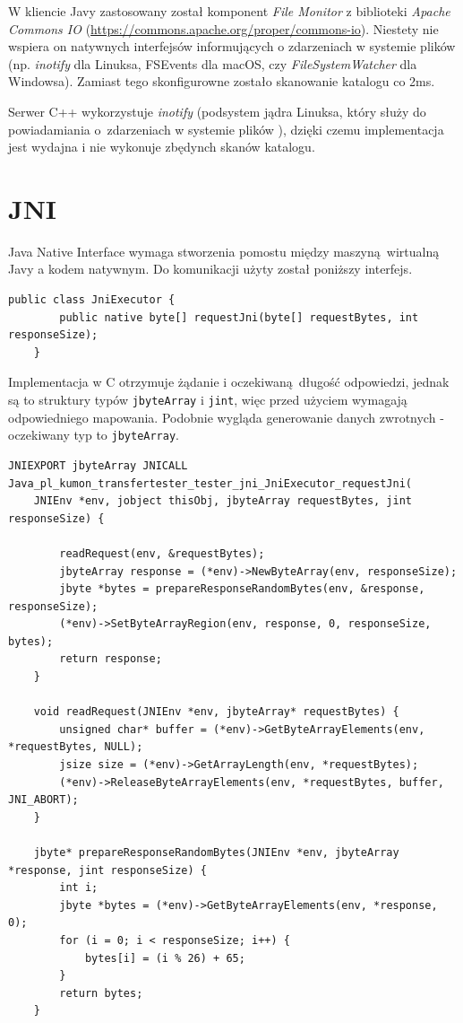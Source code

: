 W kliencie Javy zastosowany został komponent \textit{File Monitor} z biblioteki \textit{Apache Commons IO} (\url{https://commons.apache.org/proper/commons-io}). Niestety nie wspiera on natywnych interfejsów informujących o zdarzeniach w systemie plików (np. \textit{inotify} dla Linuksa, FSEvents dla macOS, czy \textit{FileSystemWatcher} dla Windowsa). Zamiast tego skonfigurowne zostało skanowanie katalogu co 2ms.

Serwer C++ wykorzystuje \textit{inotify} (podsystem jądra Linuksa, który służy do powiadamiania o~zdarzeniach w systemie plików \cite{inotify_man}), dzięki czemu implementacja jest wydajna i nie wykonuje zbędynch skanów katalogu.


\section{JNI}

Java Native Interface wymaga stworzenia pomostu między maszyną wirtualną Javy a kodem natywnym. Do komunikacji użyty został poniższy interfejs.

\begin{lstlisting}[caption={Metoda javy, która wymaga natywnej implementacji.},captionpos=b]
    public class JniExecutor {
        public native byte[] requestJni(byte[] requestBytes, int responseSize);
    }
\end{lstlisting}

Implementacja w C otrzymuje żądanie i oczekiwaną długość odpowiedzi, jednak są to struktury typów \texttt{jbyteArray} i \texttt{jint}, więc przed użyciem wymagają odpowiedniego mapowania. Podobnie wygląda generowanie danych zwrotnych - oczekiwany typ to \texttt{jbyteArray}.

\begin{lstlisting}[caption={Natywna implementacja w C.},captionpos=b]
    JNIEXPORT jbyteArray JNICALL Java_pl_kumon_transfertester_tester_jni_JniExecutor_requestJni(
    JNIEnv *env, jobject thisObj, jbyteArray requestBytes, jint responseSize) {

        readRequest(env, &requestBytes);
        jbyteArray response = (*env)->NewByteArray(env, responseSize);
        jbyte *bytes = prepareResponseRandomBytes(env, &response, responseSize);
        (*env)->SetByteArrayRegion(env, response, 0, responseSize, bytes);
        return response;
    }

    void readRequest(JNIEnv *env, jbyteArray* requestBytes) {
        unsigned char* buffer = (*env)->GetByteArrayElements(env, *requestBytes, NULL);
        jsize size = (*env)->GetArrayLength(env, *requestBytes);
        (*env)->ReleaseByteArrayElements(env, *requestBytes, buffer, JNI_ABORT);
    }

    jbyte* prepareResponseRandomBytes(JNIEnv *env, jbyteArray *response, jint responseSize) {
        int i;
        jbyte *bytes = (*env)->GetByteArrayElements(env, *response, 0);
        for (i = 0; i < responseSize; i++) {
            bytes[i] = (i % 26) + 65;
        }
        return bytes;
    }
\end{lstlisting}


